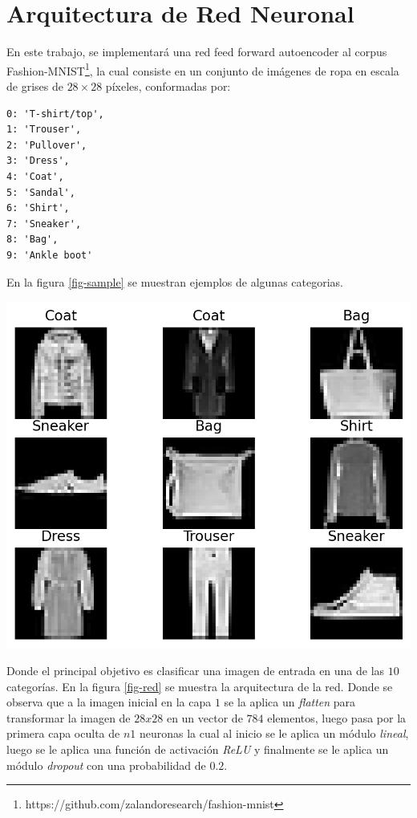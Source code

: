 \documentclass[aps,prl,reprint,groupedaddress]{revtex4-2}
\newenvironment{Figura}
  {\par\medskip\noindent\minipage{\linewidth}}
  {\endminipage\par\medskip}
\begin{document}
\section{Arquitectura de Red Neuronal}
En este trabajo, se implementará una red feed forward autoencoder al corpus 
Fashion-MNIST\footnote{https://github.com/zalandoresearch/fashion-mnist}, la 
cual consiste en un conjunto de imágenes de ropa en escala de grises de 
$28\times 28$ píxeles, conformadas por:
\begin{verbatim}
0: 'T-shirt/top',
1: 'Trouser',
2: 'Pullover',
3: 'Dress',
4: 'Coat',
5: 'Sandal',
6: 'Shirt',
7: 'Sneaker',
8: 'Bag',
9: 'Ankle boot'
\end{verbatim}

En la figura \ref{fig-sample} se muestran ejemplos de algunas categorias.
\begin{Figura}
  \centering
  \includegraphics[width=1\textwidth]{figs/sample.png}
  \label{fig-sample}
\end{Figura}

Donde el principal objetivo es clasificar una imagen de entrada en una de las 
$10$ categorías. En la figura \ref{fig-red} se muestra la arquitectura de la red.
Donde se observa que a la imagen inicial en la capa $1$ se la aplica un 
\textit{flatten} para transformar la imagen de $28x28$ en un vector de $784$ 
elementos, luego pasa por la primera capa oculta de $n1$ neuronas la cual al 
inicio se le aplica un módulo \textit{lineal}, luego se le aplica una función 
de activación \textit{ReLU} y finalmente se le aplica un módulo \textit{dropout} 
con una probabilidad de $0.2$.
\end{document}
